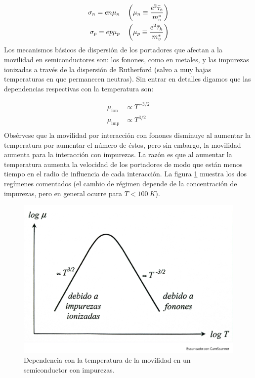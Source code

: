 \begin{equation}
	\begin{split}
		\sigma_n = en\mu_n \quad & \left( \mu_n \equiv \frac{e^2 \bar{\tau}_e}{m_c^*} \right) \\	
		\sigma_p = ep\mu_p \quad & \left( \mu_p \equiv \frac{e^2 \bar{\tau}_h}{m_v^*}  \right)
	\end{split} \label{Ec:09-04-02}
\end{equation}
Los mecanismos básicos de dispersión de los portadores que afectan a la movilidad en semiconductores son: los fonones, como en metales, y las impurezas ionizadas a través de la dispersión de Rutherford (salvo a muy bajas temperaturas en que permanecen neutras). Sin entrar en detalles digamos que las dependencias respectivas con la temperatura son:

\begin{equation}
\begin{split}
\mu_{\text{fon}} & \propto T^{-3/2} \\
\mu_{\text{imp}} & \propto T^{3/2} \\
\end{split}
\end{equation}
Obsérvese que la movilidad por interacción con fonones disminuye al aumentar la temperatura por aumentar el número de éstos, pero sin embargo, la movilidad aumenta para la interacción con impurezas. La razón es que al aumentar la temperatura aumenta la velocidad de los portadores de modo que están menos tiempo en el radio de influencia de cada interacción. La figura \ref{Fig:09-05} muestra los dos regímenes comentados (el cambio de régimen depende de la concentración de impurezas, pero en general ocurre para $T<100\ \unit{K}$).

\begin{figure}[h!] \centering
	\includegraphics[scale=0.35]{Cuerpo/Ch_09/Fotos libro 5.pdf}
	\caption{Dependencia con la temperatura de la movilidad en un semiconductor con impurezas.}
	\label{Fig:09-05}
\end{figure}

